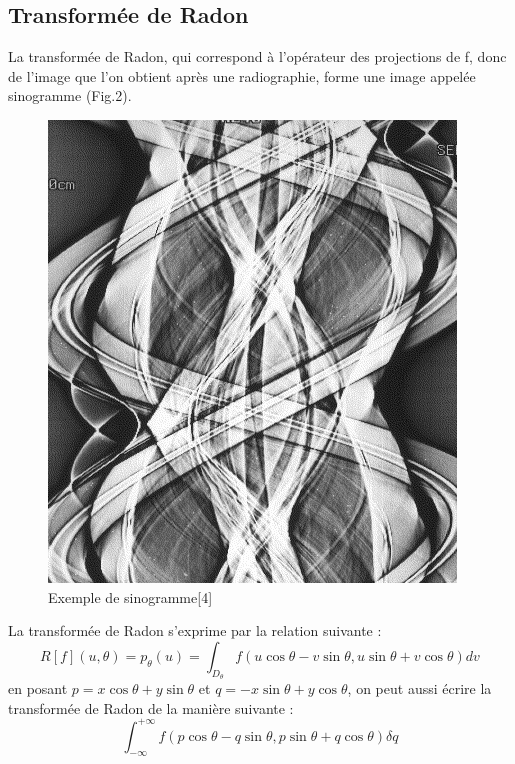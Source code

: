 \documentclass[conference]{IEEEtran}
\begin{document}
\subsection{Transformée de Radon}

La transformée de Radon, qui correspond à l'opérateur des projections de f, donc de l'image que l'on obtient après une radiographie, forme une image appelée sinogramme (Fig.2). 

\begin{figure}[H]
\centering
\includegraphics[scale=0.4]{sinogrammeExemple}
\caption[Exemple de sinogramme]{Exemple de sinogramme[4]}
\label{fig:gallery}
\end{figure}

La transformée de Radon s'exprime par la relation suivante :
\[R[f](u,\theta)=p_\theta(u)
=\int_{D_\theta} f(u\cos\theta-v\sin\theta, u\sin\theta+v\cos\theta)dv\]
en posant $p=x\cos\theta+y\sin\theta$ et $q=-x\sin\theta+y\cos\theta$, on peut aussi écrire la transformée de Radon de la manière suivante : \[\int_{-\infty}^{+\infty} f(p\cos\theta-q\sin\theta, p\sin\theta+q\cos\theta)\delta q\]
\end{document}
